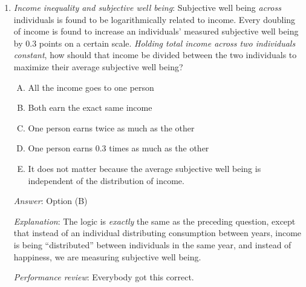 \documentclass[10pt]{amsart}
\begin{document}
\begin{enumerate}
\item {\em Income inequality and subjective well being}: Subjective
  well being {\em across} individuals is found to be logarithmically
  related to income. Every doubling of income is found to increase an
  individuals' measured subjective well being by $0.3$ points on a
  certain scale. {\em Holding total income across two individuals
  constant}, how should that income be divided between the two
  individuals to maximize their average subjective well being?

  \begin{enumerate}[(A)]
  \item All the income goes to one person
  \item Both earn the exact same income
  \item One person earns twice as much as the other
  \item One person earns $0.3$ times as much as the other
  \item It does not matter because the average subjective well being
  is independent of the distribution of income.
  \end{enumerate}

  {\em Answer}: Option (B)

  {\em Explanation}: The logic is {\em exactly} the same as the
  preceding question, except that instead of an individual
  distributing consumption between years, income is being
  ``distributed'' between individuals in the same year, and instead of
  happiness, we are measuring subjective well being.

  {\em Performance review}: Everybody got this correct.
\end{enumerate}
\end{document}
